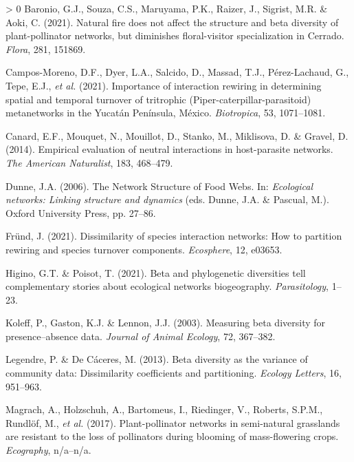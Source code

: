 \documentclass[11pt]{article}
\newlength{\cslhangindent}
\newenvironment{CSLReferences}[3] %
 {%
  \setlength{\parindent}{0pt}
  \ifodd #1 \everypar{\setlength{\hangindent}{\cslhangindent}}\ignorespaces\fi
  \ifnum #2 > 0
  \setlength{\parskip}{#2\baselineskip}
  \fi
 }%
 {}
\begin{document}
\hypertarget{refs}{}
\begin{CSLReferences}{1}{0}
\leavevmode\hypertarget{ref-Baronio2021NatFir}{}%
Baronio, G.J., Souza, C.S., Maruyama, P.K., Raizer, J., Sigrist, M.R. \&
Aoki, C. (2021). Natural fire does not affect the structure and beta
diversity of plant-pollinator networks, but diminishes floral-visitor
specialization in Cerrado. \emph{Flora}, 281, 151869.

\leavevmode\hypertarget{ref-Campos-Moreno2021ImpInt}{}%
Campos-Moreno, D.F., Dyer, L.A., Salcido, D., Massad, T.J.,
Pérez-Lachaud, G., Tepe, E.J., \emph{et al.} (2021). Importance of
interaction rewiring in determining spatial and temporal turnover of
tritrophic (Piper-caterpillar-parasitoid) metanetworks in the Yucatán
Península, México. \emph{Biotropica}, 53, 1071--1081.

\leavevmode\hypertarget{ref-Canard2014EmpEva}{}%
Canard, E.F., Mouquet, N., Mouillot, D., Stanko, M., Miklisova, D. \&
Gravel, D. (2014). Empirical evaluation of neutral interactions in
host-parasite networks. \emph{The American Naturalist}, 183, 468--479.

\leavevmode\hypertarget{ref-Dunne2006NetStr}{}%
Dunne, J.A. (2006). The Network Structure of Food Webs. In:
\emph{Ecological networks: Linking structure and dynamics} (eds. Dunne,
J.A. \& Pascual, M.). Oxford University Press, pp. 27--86.

\leavevmode\hypertarget{ref-Frund2021DisSpe}{}%
Fründ, J. (2021). Dissimilarity of species interaction networks: How to
partition rewiring and species turnover components. \emph{Ecosphere},
12, e03653.

\leavevmode\hypertarget{ref-Higino2021BetPhy}{}%
Higino, G.T. \& Poisot, T. (2021). Beta and phylogenetic diversities
tell complementary stories about ecological networks biogeography.
\emph{Parasitology}, 1--23.

\leavevmode\hypertarget{ref-Koleff2003MeaBet}{}%
Koleff, P., Gaston, K.J. \& Lennon, J.J. (2003). Measuring beta
diversity for presence--absence data. \emph{Journal of Animal Ecology},
72, 367--382.

\leavevmode\hypertarget{ref-Legendre2013BetDiv}{}%
Legendre, P. \& De Cáceres, M. (2013). Beta diversity as the variance of
community data: Dissimilarity coefficients and partitioning.
\emph{Ecology Letters}, 16, 951--963.

\leavevmode\hypertarget{ref-Magrach2017PlaNet}{}%
Magrach, A., Holzschuh, A., Bartomeus, I., Riedinger, V., Roberts,
S.P.M., Rundlöf, M., \emph{et al.} (2017). Plant-pollinator networks in
semi-natural grasslands are resistant to the loss of pollinators during
blooming of mass-flowering crops. \emph{Ecography}, n/a--n/a.


\end{CSLReferences}
\end{document}
